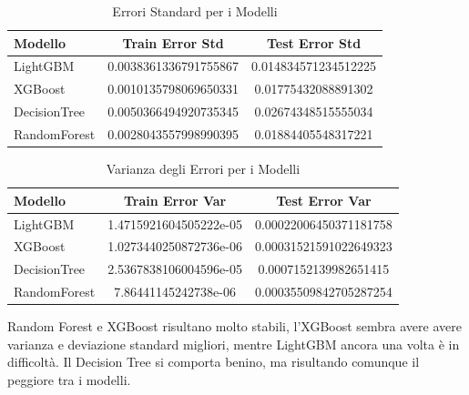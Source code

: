 \begin{table}[H]
    \centering
    \begin{tabular}{lcc}
    \toprule
    \textbf{Modello} & \textbf{Train Error Std} & \textbf{Test Error Std} \\
    \midrule
    LightGBM & 0.0038361336791755867 & 0.014834571234512225 \\
    XGBoost & 0.0010135798069650331 & 0.01775432088891302 \\
    DecisionTree & 0.0050366494920735345 & 0.02674348515555034 \\
    RandomForest & 0.0028043557998990395 & 0.01884405548317221 \\
    \bottomrule
    \end{tabular}
    \caption{Errori Standard per i Modelli}
    
\end{table}

\begin{table}[H]
    \centering
    \begin{tabular}{lcc}
    \toprule
    \textbf{Modello} & \textbf{Train Error Var} & \textbf{Test Error Var} \\
    \midrule
    LightGBM & 1.4715921604505222e-05 & 0.00022006450371181758 \\
    XGBoost & 1.0273440250872736e-06 & 0.00031521591022649323 \\
    DecisionTree & 2.5367838106004596e-05 & 0.0007152139982651415\\
    RandomForest & 7.86441145242738e-06 & 0.00035509842705287254 \\
    \bottomrule
    \end{tabular}
    \caption{Varianza degli Errori per i Modelli}
    
\end{table}

\noindent Random Forest e XGBoost risultano molto stabili, l'XGBoost sembra avere avere varianza e deviazione standard migliori, mentre LightGBM ancora una volta è in difficoltà. Il Decision Tree si comporta benino, ma risultando comunque il peggiore tra i modelli.


